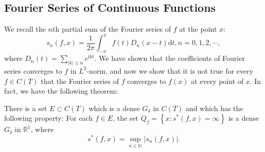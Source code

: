 \subsection{Fourier Series of Continuous Functions}
We recall the $n$th partial sum of the Fourier series of $f$ at the point $x$: 
$$
s_n\left( f,x \right) =\frac{1}{2\pi}\int_{-\pi}^{\pi}{f\left( t \right) D_n\left( x-t \right) \mathrm{d}t},n=0,1,2,\cdots ,
$$
where $D_n\left( t \right) =\sum_{\left| k \right|\le n}{e^{\mathrm{i}kt}}$. We have shown that the coefficients of Fourier series converges to $f$ in $L^2$-norm, and now we show that it is not true for every $f\in C(T)$ that the Fourier series of $f$ converges to $f(x)$ at every point of $x$. In fact, we have the following theorem: 
\begin{theorem}
There is a set $E\subset C(T)$ which is a dense $G_\delta$ in $C(T)$ and which has the following property: For each $f\in E$, the set $Q_f=\left\{ x:s^*\left( f,x \right) =\infty \right\} $ is a dense $G_\delta$ in $\mathbb{R}^1$, where 
$$
s^*\left( f,x \right) =\mathop {\mathrm{sup}} \limits_{n\in \mathbb{N}}\left| s_n\left( f,x \right) \right|.
$$
\end{theorem}

